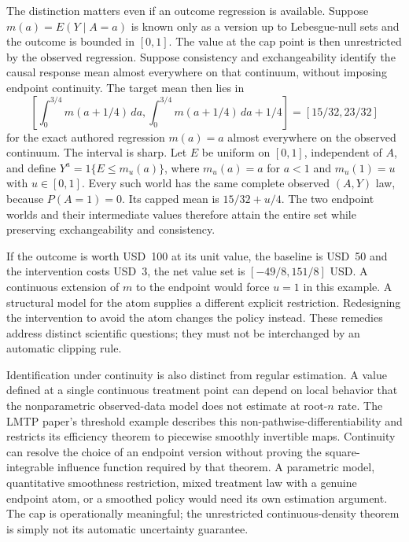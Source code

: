 The distinction matters even if an outcome regression is available. Suppose
$m(a)=E(Y\mid A=a)$ is known only as a version up to Lebesgue-null sets and
the outcome is bounded in $[0,1]$. The value at the cap point is then
unrestricted by the observed regression. Suppose consistency and
exchangeability identify the causal response mean almost everywhere on that
continuum, without imposing endpoint continuity. The target mean then lies in
\begin{equation}
 \left[\int_0^{3/4}m(a+1/4)\,da,
       \int_0^{3/4}m(a+1/4)\,da+1/4\right]
 = [15/32,23/32]
 \label{exec17:s5-cap-set}
 \end{equation}
for the exact authored regression $m(a)=a$ almost everywhere on the observed
continuum. The interval is sharp. Let $E$ be uniform on $[0,1]$, independent
of $A$, and define $Y^a=1\{E\leq m_u(a)\}$, where $m_u(a)=a$ for $a<1$ and
$m_u(1)=u$ with $u\in[0,1]$. Every such world has the same complete
observed $(A,Y)$ law, because $P(A=1)=0$. Its capped mean is
$15/32+u/4$. The two endpoint worlds and their intermediate values therefore
attain the entire set while preserving exchangeability and consistency.

If the outcome is worth USD~100 at its unit value, the baseline is USD~50 and the
intervention costs USD~3, the net value set is
$[-49/8,151/8]$ USD. A continuous extension of $m$ to the endpoint would
force $u=1$ in this example. A structural model for the atom supplies a
different explicit restriction. Redesigning the intervention to avoid the
atom changes the policy instead. These remedies address distinct scientific
questions; they must not be interchanged by an automatic clipping rule.
\citep{lmtp2023,exec17_s5_math}

Identification under continuity is also distinct from regular estimation.
A value defined at a single continuous treatment point can depend on local
behavior that the nonparametric observed-data model does not estimate at
root-$n$ rate. The LMTP paper's threshold example describes this
non-pathwise-differentiability and restricts its efficiency theorem to
piecewise smoothly invertible maps. Continuity can resolve the choice of an
endpoint version without proving the square-integrable influence function
required by that theorem. A parametric model, quantitative smoothness
restriction, mixed treatment law with a genuine endpoint atom, or a smoothed
policy would need its own estimation argument. The cap is operationally
meaningful; the unrestricted continuous-density theorem is simply not its
automatic uncertainty guarantee.~\citep{lmtp2023}

